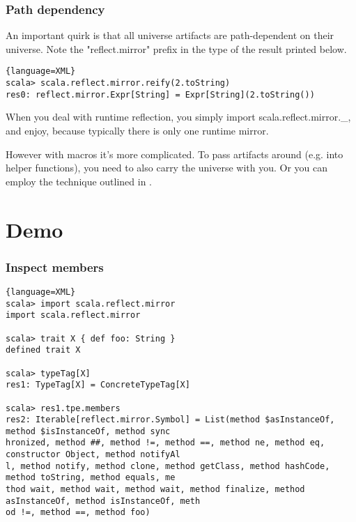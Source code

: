 \documentclass[hyperref={bookmarks=false}]{beamer}
\begin{document}
\begin{frame}[fragile]
\frametitle{Path dependency}

An important quirk is that all universe artifacts are path-dependent on their universe.
Note the "reflect.mirror" prefix in the type of the result printed below.

\begin{lstlisting}{language=XML}
scala> scala.reflect.mirror.reify(2.toString)
res0: reflect.mirror.Expr[String] = Expr[String](2.toString())
\end{lstlisting}

When you deal with runtime reflection, you simply import scala.reflect.mirror.\_, and enjoy,
because typically there is only one runtime mirror.

However with macros it's more complicated. To pass artifacts around (e.g. into helper functions),
you need to also carry the universe with you. Or you can employ the technique outlined in
.
\end{frame}

\section{Demo}

\begin{frame}[fragile]
\frametitle{Inspect members}

\begin{lstlisting}{language=XML}
scala> import scala.reflect.mirror
import scala.reflect.mirror

scala> trait X { def foo: String }
defined trait X

scala> typeTag[X]
res1: TypeTag[X] = ConcreteTypeTag[X]

scala> res1.tpe.members
res2: Iterable[reflect.mirror.Symbol] = List(method $asInstanceOf, method $isInstanceOf, method sync
hronized, method ##, method !=, method ==, method ne, method eq, constructor Object, method notifyAl
l, method notify, method clone, method getClass, method hashCode, method toString, method equals, me
thod wait, method wait, method wait, method finalize, method asInstanceOf, method isInstanceOf, meth
od !=, method ==, method foo)
\end{lstlisting}
\end{frame}
\end{document}
